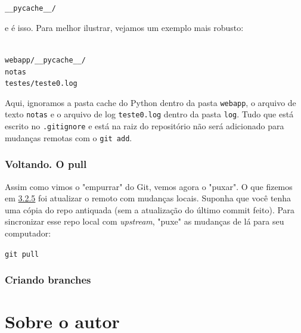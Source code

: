 \documentclass{article}
\begin{document}
  \vspace{1ex}
  \texttt{\_\_pycache\_\_/}
  \vspace{1ex}

  e é isso. Para melhor ilustrar, vejamos um exemplo mais robusto: 
  
  \vspace{1ex}
  \texttt{\\ 
  \noindent webapp/\_\_pycache\_\_/  \\ 
  \noindent notas \\ 
  \noindent testes/teste0.log}
  \vspace{1ex}

  Aqui, ignoramos a pasta cache do Python dentro da pasta \texttt{webapp}, o arquivo de texto \texttt{notas} e o arquivo 
  de log \texttt{teste0.log} dentro da pasta \texttt{log}. Tudo que está escrito no \texttt{.gitignore} e está na raiz 
  do repositório não será adicionado para mudanças remotas com o \texttt{git add}.
  
  
  \subsubsection{Voltando. O pull}

  Assim como vimos o "empurrar" do Git, vemos agora o "puxar". O que fizemos em \href{sec:push}{3.2.5} foi atualizar o remoto com 
  mudanças locais. Suponha que você tenha uma cópia do repo antiquada (sem a atualização do último commit feito). Para sincronizar 
  esse repo local com \textit{upstream}, "puxe" as mudanças de lá para seu computador: 

  \vspace{1ex}
  \texttt{git pull}
  \vspace{1ex}
 
  \subsubsection{Criando branches}

  

  \newpage
  \section{Sobre o autor}
\end{document}
